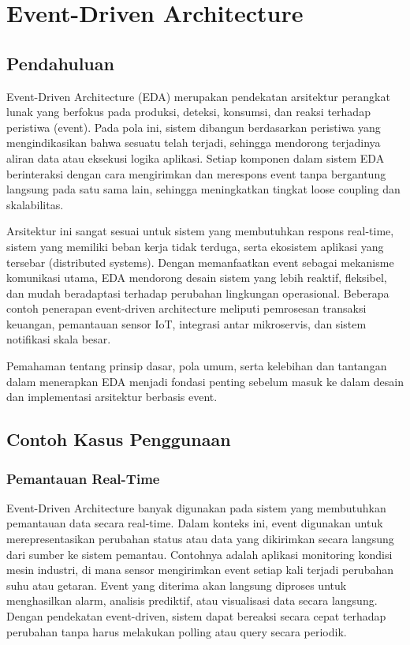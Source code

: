 \chapter{Event-Driven Architecture}

\section{Pendahuluan}

Event-Driven Architecture (EDA) merupakan pendekatan arsitektur perangkat lunak yang berfokus pada produksi, deteksi, konsumsi, dan reaksi terhadap peristiwa (event). Pada pola ini, sistem dibangun berdasarkan peristiwa yang mengindikasikan bahwa sesuatu telah terjadi, sehingga mendorong terjadinya aliran data atau eksekusi logika aplikasi. Setiap komponen dalam sistem EDA berinteraksi dengan cara mengirimkan dan merespons event tanpa bergantung langsung pada satu sama lain, sehingga meningkatkan tingkat loose coupling dan skalabilitas.

Arsitektur ini sangat sesuai untuk sistem yang membutuhkan respons real-time, sistem yang memiliki beban kerja tidak terduga, serta ekosistem aplikasi yang tersebar (distributed systems). Dengan memanfaatkan event sebagai mekanisme komunikasi utama, EDA mendorong desain sistem yang lebih reaktif, fleksibel, dan mudah beradaptasi terhadap perubahan lingkungan operasional. Beberapa contoh penerapan event-driven architecture meliputi pemrosesan transaksi keuangan, pemantauan sensor IoT, integrasi antar mikroservis, dan sistem notifikasi skala besar.

Pemahaman tentang prinsip dasar, pola umum, serta kelebihan dan tantangan dalam menerapkan EDA menjadi fondasi penting sebelum masuk ke dalam desain dan implementasi arsitektur berbasis event.


\section{Contoh Kasus Penggunaan}

\subsection{Pemantauan Real-Time}
Event-Driven Architecture banyak digunakan pada sistem yang membutuhkan pemantauan data secara real-time. Dalam konteks ini, event digunakan untuk merepresentasikan perubahan status atau data yang dikirimkan secara langsung dari sumber ke sistem pemantau. Contohnya adalah aplikasi monitoring kondisi mesin industri, di mana sensor mengirimkan event setiap kali terjadi perubahan suhu atau getaran. Event yang diterima akan langsung diproses untuk menghasilkan alarm, analisis prediktif, atau visualisasi data secara langsung. Dengan pendekatan event-driven, sistem dapat bereaksi secara cepat terhadap perubahan tanpa harus melakukan polling atau query secara periodik.

